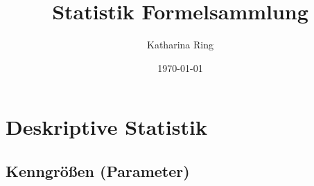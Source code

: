 \documentclass[10pt]{article}
\begin{document}
\title{Statistik Formelsammlung}
\author{Katharina Ring}
\date{\today}
\maketitle

\clearpage

\tableofcontents

\clearpage




\section{Deskriptive Statistik}

\raggedright

\subsection{Kenngrößen (Parameter)}
\end{document}

